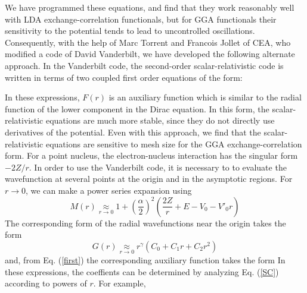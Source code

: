 \documentclass[11pt]{article}
\begin{document}
We have programmed these equations, and find that they work reasonably well
with LDA exchange-correlation functionals, but for GGA functionals their
sensitivity to the potential tends to lead to uncontrolled oscillations.   
Consequently, with the help of Marc Torrent and Francois Jollet of CEA, who
modified a code of David Vanderbilt, we have developed the following alternate
approach.    In the Vanderbilt code, the second-order scalar-relativistic
code is written in terms of two coupled first order equations of the form:

In these expressions, $F(r)$ is an auxiliary function which is similar to
the radial function of the lower component in the Dirac equation.
In this form, the scalar-relativistic equations are much more stable, since
they do not directly use derivatives of the potential.   Even with this
approach, we find that the scalar-relativistic equations are sensitive to
mesh size for the GGA exchange-correlation form.   
For a point nucleus, the electron-nucleus interaction has the
singular form $-2Z/r$.   
In order to use the Vanderbilt
code, it is necessary to to evaluate the wavefunction at several points
at the origin and in the asymptotic regions.    For $r \rightarrow 0$,
we can make a power series expansion  using
\begin{equation}
M(r) \underset{r \rightarrow 0}{\approx}
 1 +\left(\frac{\alpha}{2} \right)^2 \left( \frac{2Z}{r}+
E - V_0
 - V'_0 r \right) \label{smallr}
\end{equation}
The corresponding
 form of the radial wavefunctions near the origin takes
the form
\begin{equation} \label{upsmall}
G(r) \underset{r \rightarrow 0}{\approx} r^{\gamma} \left(C_0 + C_1 r  +C_2 r^2\right) 
\end{equation}
and, from Eq. (\ref{first}) the corresponding auxiliary function takes
the form
In these expressions, 
the coeffients can be determined by analyzing Eq. (\ref{SC}) 
according to powers of $r$.
For example,
\end{document}
